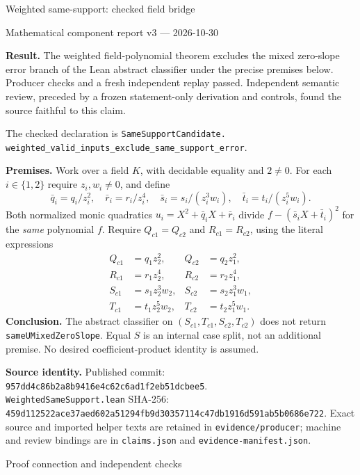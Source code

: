 \documentclass[11pt]{article}
\begin{document}
{\LARGE Weighted same-support: checked field bridge}\par
{\large Mathematical component report v3 --- 2026-10-30}\par
\textbf{Result.} The weighted field-polynomial theorem excludes the mixed zero-slope error branch of the Lean abstract classifier under the precise premises below. Producer checks and a fresh independent replay passed. Independent semantic review, preceded by a frozen statement-only derivation and controls, found the source faithful to this claim.

The checked declaration is \texttt{SameSupportCandidate.}\\
{\small\texttt{weighted\_valid\_inputs\_exclude\_same\_support\_error}}.

\textbf{Premises.} Work over a field $K$, with decidable equality and $2\ne0$. For each $i\in\{1,2\}$ require $z_i,w_i\ne0$, and define
\[
\bar q_i=q_i/z_i^2,\quad\bar r_i=r_i/z_i^4,\quad
\bar s_i=s_i/(z_i^3w_i),\quad\bar t_i=t_i/(z_i^5w_i).
\]
Both normalized monic quadratics $u_i=X^2+\bar q_iX+\bar r_i$ divide $f-(\bar s_iX+\bar t_i)^2$ for the \emph{same} polynomial $f$. Require $Q_{c1}=Q_{c2}$ and $R_{c1}=R_{c2}$, using the literal expressions
\begin{align*}
Q_{c1}&=q_1z_2^2,& Q_{c2}&=q_2z_1^2,\\
R_{c1}&=r_1z_2^4,& R_{c2}&=r_2z_1^4,\\
S_{c1}&=s_1z_2^3w_2,& S_{c2}&=s_2z_1^3w_1,\\
T_{c1}&=t_1z_2^5w_2,& T_{c2}&=t_2z_1^5w_1.
\end{align*}
\textbf{Conclusion.} The abstract classifier on $(S_{c1},T_{c1},S_{c2},T_{c2})$ does not return \texttt{sameUMixedZeroSlope}. Equal $S$ is an internal case split, not an additional premise. No desired coefficient-product identity is assumed.

\textbf{Source identity.} Published commit:\\
\texttt{957dd4c86b2a8b9416e4c62c6ad1f2eb51dcbee5}.\\
\texttt{WeightedSameSupport.lean} SHA-256:\\
{\footnotesize\texttt{459d112522ace37aed602a51294fb9d30357114c47db1916d591ab5b0686e722}}.
Exact source and imported helper texts are retained in \texttt{evidence/producer}; machine and review bindings are in \texttt{claims.json} and \texttt{evidence-manifest.json}.

\newpage
{\Large Proof connection and independent checks}
\end{document}
